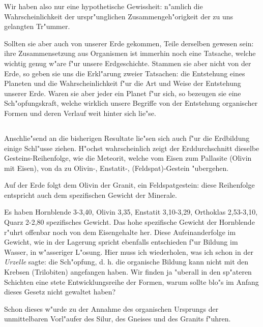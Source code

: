 \documentclass[a4paper, 11pt, oneside]{article}
\begin{document}
Wir haben also nur eine hypothetische Gewissheit: n"amlich die Wahrscheinlichkeit der urspr"unglichen Zusammengeh"origkeit der zu uns gelangten Tr"ummer.

Sollten sie aber auch von unserer Erde gekommen, Teile derselben gewesen sein: ihre Zusammensetzung aus Organismen ist immerhin noch eine Tatsache, welche wichtig genug w"are f"ur unsere Erdgeschichte. Stammen sie aber nicht von der Erde, so geben sie uns die Erkl"arung zweier Tatsachen: die Entstehung eines Planeten und die Wahrscheinlichkeit f"ur die Art und Weise der Entstehung unserer Erde. Waren sie aber jeder ein Planet f"ur sich, so bezeugen sie eine Sch"opfungskraft, welche wirklich unsere Begriffe von der Entstehung organischer Formen und deren Verlauf weit hinter sich lie"se.
\clearpage
\subsection{}
\paragraph{}
Anschlie"send an die bisherigen Resultate lie"sen sich auch f"ur die Erdbildung einige Schl"usse ziehen. H"ochst wahrscheinlich zeigt der Erddurchschnitt dieselbe Gesteins-Reihenfolge, wie die Meteorit, welche vom Eisen zum Pallasite (Olivin mit Eisen), von da zu Olivin-, Enstatit-, (Feldspat)-Gestein "ubergehen.

Auf der Erde folgt dem Olivin der Granit, ein Feldspatgestein: diese Reihenfolge entspricht auch dem spezifischen Gewicht der Minerale.

Es haben Hornblende 3-3,40, Olivin 3,35, Enstatit 3,10-3,29, Orthoklas 2,53-3,10, Quarz 2-2,80 spezifisches Gewicht. Das hohe spezifische Gewicht der Hornblende r"uhrt offenbar noch von dem Eisengehalte her. Diese Aufeinanderfolge im Gewicht, wie in der Lagerung spricht ebenfalls entschieden f"ur Bildung im Wasser, in w"asseriger L"osung. Hier muss ich wiederholen, was ich schon in der \emph{Urzelle} sagte: die Sch"opfung, d. h. die organische Bildung kann nicht mit den Krebsen (Trilobiten) angefangen haben. Wir finden ja "uberall in den sp"ateren Schichten eine stete Entwicklungsreihe der Formen, warum sollte blo"s im Anfang dieses Gesetz nicht gewaltet haben?

Schon dieses w"urde zu der Annahme des organischen Ursprungs der unmittelbaren Vorl"aufer des Silur, des Gneises und des Granits f"uhren.
\end{document}
